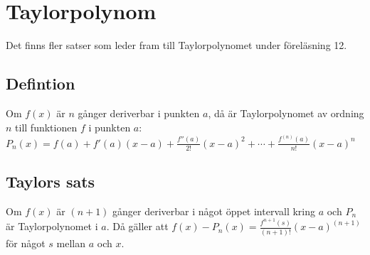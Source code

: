 \documentclass{article}
\begin{document}
\newpage
\section{Taylorpolynom}
Det finns fler satser som leder fram till Taylorpolynomet under föreläsning 12.
\subsection{Defintion}
Om $f(x)$ är $n$ gånger deriverbar i punkten $a$, då är Taylorpolynomet av ordning $n$ till funktionen $f$ i punkten $a$:\\
$P_{n}(x)=f(a)+f'(a)(x-a)+\frac{f''(a)}{2!}(x-a)^2+\cdots+\frac{f^{(n)}(a)}{n!}(x-a)^n$

\subsection{Taylors sats}
Om $f(x)$ är $(n+1)$ gånger deriverbar i något öppet intervall kring $a$ och $P_{n}$ är Taylorpolynomet i $a$. Då gäller att $f(x)-P_{n}(x)=\frac{f^{n+1}(s)}{(n+1)!}(x-a)^{(n+1)}$ för något $s$ mellan $a$ och $x$.
\end{document}
